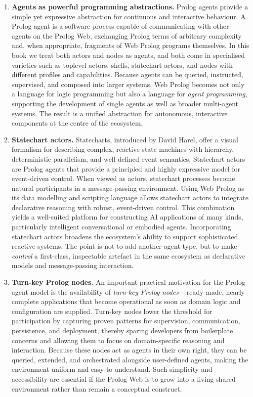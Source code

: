 \begin{enumerate}

\item \textbf{Agents as powerful programming abstractions.}
Prolog agents provide a simple yet expressive abstraction for continuous and interactive behaviour. A Prolog agent is a software process capable of communicating with other agents on the Prolog Web, exchanging Prolog terms of arbitrary complexity and, when appropriate, fragments of Web Prolog programs themselves. In this book we treat both actors and nodes as agents, and both come in specialised varieties such as toplevel actors, shells, statechart actors, and nodes with different profiles and capabilities. Because agents can be queried, instructed, supervised, and composed into larger systems, Web Prolog becomes not only a language for logic programming but also a language for \emph{agent programming}, supporting the development of single agents as well as broader multi-agent systems. The result is a unified abstraction for autonomous, interactive components at the centre of the ecosystem.

\item \textbf{Statechart actors.}
Statecharts, introduced by David Harel, offer a visual formalism for describing complex, reactive state machines with hierarchy, deterministic parallelism, and well-defined event semantics. Statechart actors are Prolog agents that provide a principled and highly expressive model for event-driven control. When viewed as actors, statechart processes become natural participants in a message-passing environment. Using Web Prolog as its data modelling and scripting language allows statechart actors to integrate declarative reasoning with robust, event-driven control. This combination yields a well-suited platform for constructing AI applications of many kinds, particularly intelligent conversational or embodied agents. Incorporating statechart actors broadens the ecosystem's ability to support sophisticated reactive systems. The point is not to add another agent type, but to make \emph{control} a first-class, inspectable artefact in the same ecosystem as declarative models and message-passing interaction.

\item \textbf{Turn-key Prolog nodes.}
An important practical motivation for the Prolog agent model is the availability of \emph{turn-key Prolog nodes} -- ready-made, nearly complete applications that become operational as soon as domain logic and configuration are supplied. Turn-key nodes lower the threshold for participation by capturing proven patterns for supervision, communication, persistence, and deployment, thereby sparing developers from boilerplate concerns and allowing them to focus on domain-specific reasoning and interaction. Because these nodes act as agents in their own right, they can be queried, extended, and orchestrated alongside user-defined agents, making the environment uniform and easy to understand. Such simplicity and accessibility are essential if the Prolog Web is to grow into a living shared environment rather than remain a conceptual construct.

\end{enumerate}

